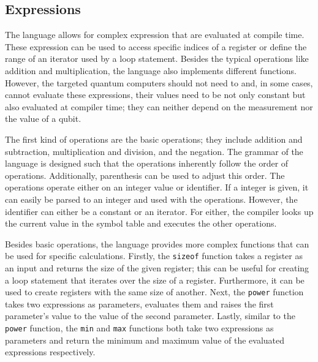 \subsection{Expressions}
\label{sec:concept_expressions}
The language allows for complex expression that are evaluated at compile time. These expression can be used to access specific indices of a register or define the range of an iterator used by a loop statement. Besides the typical operations like addition and multiplication, the language also implements different functions. However, the targeted quantum computers should not need to and, in some cases, cannot evaluate these expressions, their values need to be not only constant but also evaluated at compiler time; they can neither depend on the measurement nor the value of a qubit.  

The first kind of operations are the basic operations; they include addition and subtraction, multiplication and division, and the negation. The grammar of the language is designed such that the operations inherently follow the order of operations. Additionally, parenthesis can be used to adjust this order. The operations operate either on an integer value or identifier. If a integer is given, it can easily be parsed to an integer and used with the operations. However, the identifier can either be a constant or an iterator. For either, the compiler looks up the current value in the symbol table and executes the other operations. 

Besides basic operations, the language provides more complex functions that can be used for specific calculations. Firstly, the \texttt{sizeof} function takes a register as an input and returns the size of the given register; this can be useful for creating a loop statement that iterates over the size of a register. Furthermore, it can be used to create registers with the same size of another. Next, the \texttt{power} function takes two expressions as parameters, evaluates them and raises the first parameter's value to the value of the second parameter. Lastly, similar to the \texttt{power} function, the \texttt{min} and \texttt{max} functions both take two expressions as parameters and return the minimum and maximum value of the evaluated expressions respectively.    

